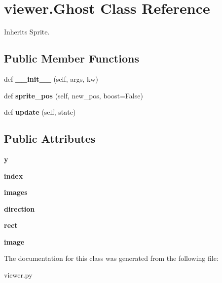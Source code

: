 \hypertarget{classviewer_1_1_ghost}{}\section{viewer.\+Ghost Class Reference}
\label{classviewer_1_1_ghost}


Inherits Sprite.

\subsection*{Public Member Functions}
\begin{DoxyCompactItemize}
\item 
\mbox{\label{classviewer_1_1_ghost_a0e02338eee75d4b687ebf9fb5fa9795b}} 
def {\bfseries \+\_\+\+\_\+init\+\_\+\+\_\+} (self, args, kw)
\item 
\mbox{\label{classviewer_1_1_ghost_a756b961d5347b70a3821bd97e69a1de9}} 
def {\bfseries sprite\+\_\+pos} (self, new\+\_\+pos, boost=False)
\item 
\mbox{\label{classviewer_1_1_ghost_a88c5b529729a2d0e9689bcb3ae5ad753}} 
def {\bfseries update} (self, state)
\end{DoxyCompactItemize}
\subsection*{Public Attributes}
\begin{DoxyCompactItemize}
\item 
\mbox{\label{classviewer_1_1_ghost_a87c4dd905fd0b2c0089781d67ae877c8}} 
{\bfseries y}
\item 
\mbox{\label{classviewer_1_1_ghost_a7e02ac780b7f8e22948b213d717620a0}} 
{\bfseries index}
\item 
\mbox{\label{classviewer_1_1_ghost_a7891e99ec6ff7b6d03458718e1321f93}} 
{\bfseries images}
\item 
\mbox{\label{classviewer_1_1_ghost_af6d5c398b7537e8d9f1af6d3b62cb548}} 
{\bfseries direction}
\item 
\mbox{\label{classviewer_1_1_ghost_a974b7399ff57e9f455898505918b11bf}} 
{\bfseries rect}
\item 
\mbox{\label{classviewer_1_1_ghost_a06b2271cf0ec0333fba6b3c1821f7d3f}} 
{\bfseries image}
\end{DoxyCompactItemize}


The documentation for this class was generated from the following file\+:\begin{DoxyCompactItemize}
\item 
viewer.\+py\end{DoxyCompactItemize}
